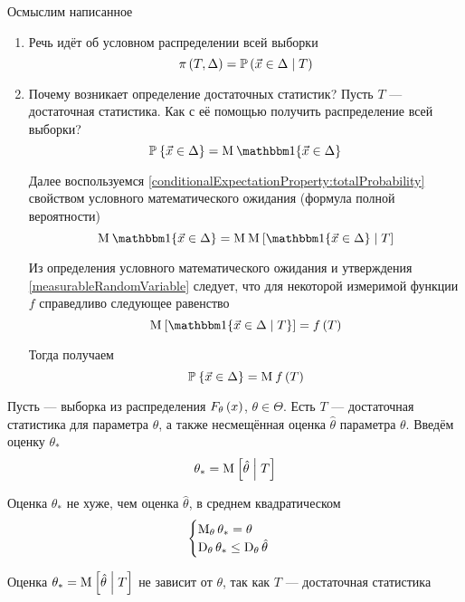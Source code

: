 Осмыслим написанное
\begin{enumerate}
  \item Речь идёт об условном распределении всей выборки
      $$\pi\left( T, \Delta \right)
      = \mathbb{P}\left( \vec{x} \in \Delta \;\middle|\; T \right)$$
  \item Почему возникает определение достаточных статистик?
      Пусть $T$ --- достаточная статистика.
      Как с её помощью получить распределение всей выборки?
      $$\Probability{\vec{x} \in \Delta}
      = \mean{\Indicator{\vec{x} \in \Delta}}$$

      Далее воспользуемся
      \ref{conditionalExpectationProperty:totalProbability}
      свойством условного математического ожидания
      (формула полной вероятности)
      $$\mean{\Indicator{\vec{x} \in \Delta}}
      = \mean{\Mean{\Indicator{\vec{x} \in \Delta} \mcond T}}$$

      Из определения условного математического ожидания и утверждения
      \ref{measurableRandomVariable} следует, что для некоторой измеримой
      функции $f$ справедливо следующее равенство
      $$\Mean{\Indicator{\vec{x} \in \Delta \mcond T}} = f\left( T \right)$$

      Тогда получаем
      $$\mathbb{P}_{{}}\left\{ \vec{x} \in \Delta \right\} = \operatorname{M}_{} f\left( T \right)$$
\end{enumerate}

\begin{theorem}
  Пусть \xsample --- выборка из распределения $F_{\theta}\left(x\right)$,
  $\theta \in \Theta$.
  Есть $T$ --- достаточная статистика для параметра $\theta$,
  а также несмещённая оценка $\hat{\theta}$ параметра $\theta$.
  Введём оценку $\theta_*$
  $$\theta_* = \operatorname{M}_{} \left[ \hat{\theta} \;\middle|\; T \right]$$

  Оценка $\theta_*$ не хуже, чем оценка $\hat{\theta}$, в среднем квадратическом
  $$\begin{cases}
      \operatorname{M}_{\theta} \theta_* = \theta \\
      \operatorname{D}_{\theta} \theta_* \le \operatorname{D}_{\theta} \hat{\theta}
  \end{cases}$$
\end{theorem}

\begin{remark}
  Оценка $\theta_* = \operatorname{M}_{} \left[ \hat{\theta} \;\middle|\; T \right]$ не зависит от $\theta$,
  так как $T$ --- достаточная статистика
\end{remark}


